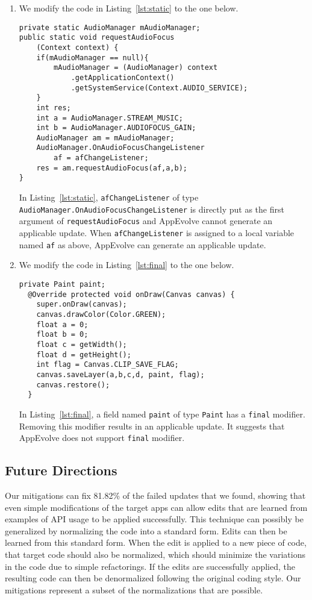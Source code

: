 \begin{enumerate}
\item We modify the code in Listing~\ref{lst:static} to the one below.
\begin{lstlisting}[language=text,numbers=none]
private static AudioManager mAudioManager;
public static void requestAudioFocus
    (Context context) {
    if(mAudioManager == null){
        mAudioManager = (AudioManager) context
            .getApplicationContext()
            .getSystemService(Context.AUDIO_SERVICE);
    }
    int res;
    int a = AudioManager.STREAM_MUSIC;
    int b = AudioManager.AUDIOFOCUS_GAIN;
    AudioManager am = mAudioManager;
    AudioManager.OnAudioFocusChangeListener
        af = afChangeListener;
    res = am.requestAudioFocus(af,a,b);
}
\end{lstlisting}
In Listing~\ref{lst:static}, {\tt afChangeListener} of type {\tt AudioManager.OnAudioFocusChangeListener} is directly put as the first argument of {\tt requestAudioFocus} and AppEvolve cannot generate an applicable update. When {\tt afChangeListener} is assigned to a local variable named {\tt af} as above, AppEvolve can generate an applicable update.

\item We modify the code in Listing~\ref{lst:final} to the one below.
\begin{lstlisting}[language=text,numbers=none]
private Paint paint;
  @Override protected void onDraw(Canvas canvas) {
    super.onDraw(canvas);
    canvas.drawColor(Color.GREEN);
    float a = 0;
    float b = 0;
    float c = getWidth();
    float d = getHeight();
    int flag = Canvas.CLIP_SAVE_FLAG;
    canvas.saveLayer(a,b,c,d, paint, flag);
    canvas.restore();
  }
\end{lstlisting}
In Listing~\ref{lst:final}, a field named {\tt paint} of type {\tt Paint} has a {\tt final} modifier. Removing this modifier results in an applicable update. It suggests that AppEvolve does not support {\tt final} modifier.
\end{enumerate}


\subsection{Future Directions}
Our mitigations can fix 81.82\% of the failed updates that we found,
showing that even simple modifications of the target apps can allow
edits that are learned from examples of API usage to be applied
successfully. This technique can possibly be generalized by normalizing the
code into a standard form. Edits can then be learned from this standard
form. When the edit is applied to a new piece of code, that target code
should also be normalized, which should minimize the variations in the code
due to simple refactorings. If the edits are successfully applied, the
resulting code can then be denormalized following the original coding
style.  Our mitigations represent a subset of the normalizations that are
possible.

